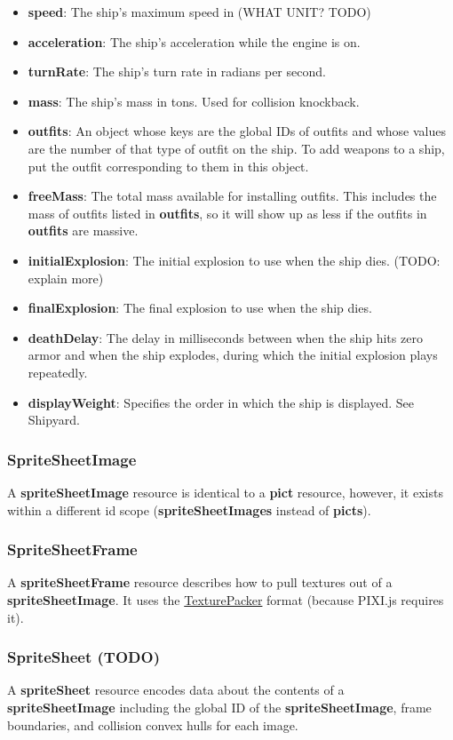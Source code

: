 \documentclass{article}
\begin{document}
\begin{itemize}
\item{\textbf{speed}}: The ship's maximum speed in (WHAT UNIT? TODO)
\item{\textbf{acceleration}}: The ship's acceleration while the engine is on.
\item{\textbf{turnRate}}: The ship's turn rate in radians per second.
\item{\textbf{mass}}: The ship's mass in tons. Used for collision knockback.
\item{\textbf{outfits}}: An object whose keys are the global IDs of outfits and whose values are the number of that type of outfit on the ship. To add weapons to a ship, put the outfit corresponding to them in this object.
\item{\textbf{freeMass}}: The total mass available for installing outfits. This includes the mass of outfits listed in \textbf{outfits}, so it will show up as less if the outfits in \textbf{outfits} are massive.
\item{\textbf{initialExplosion}}: The initial explosion to use when the ship dies. (TODO: explain more)
\item{\textbf{finalExplosion}}: The final explosion to use when the ship dies.
\item{\textbf{deathDelay}}: The delay in milliseconds between when the ship hits zero armor and when the ship explodes, during which the initial explosion plays repeatedly.
\item{\textbf{displayWeight}}: Specifies the order in which the ship is displayed. See Shipyard.

\end{itemize}

\subsubsection{SpriteSheetImage}
A \textbf{spriteSheetImage} resource is identical to a \textbf{pict} resource, however, it exists within a different id scope (\textbf{spriteSheetImages} instead of \textbf{picts}).

\subsubsection{SpriteSheetFrame}
A \textbf{spriteSheetFrame} resource describes how to pull textures out of a \textbf{spriteSheetImage}. It uses the \href{http://texturepacker.com/}{TexturePacker} format (because PIXI.js requires it).


\subsubsection{SpriteSheet (TODO)}
A \textbf{spriteSheet} resource encodes data about the contents of a \textbf{spriteSheetImage} including the global ID of the \textbf{spriteSheetImage}, frame boundaries, and collision convex hulls for each image.
\end{document}
